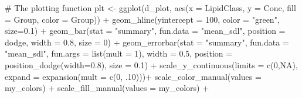 \documentclass[
  letterpaper,
  DIV=11,
  numbers=noendperiod]{scrreprt}
\newenvironment{Shaded}{\begin{snugshade}}{\end{snugshade}}
\newcommand{\AttributeTok}[1]{\textcolor[rgb]{0.40,0.45,0.13}{#1}}
\newcommand{\CommentTok}[1]{\textcolor[rgb]{0.37,0.37,0.37}{#1}}
\newcommand{\ConstantTok}[1]{\textcolor[rgb]{0.56,0.35,0.01}{#1}}
\newcommand{\DecValTok}[1]{\textcolor[rgb]{0.68,0.00,0.00}{#1}}
\newcommand{\FloatTok}[1]{\textcolor[rgb]{0.68,0.00,0.00}{#1}}
\newcommand{\FunctionTok}[1]{\textcolor[rgb]{0.28,0.35,0.67}{#1}}
\newcommand{\NormalTok}[1]{\textcolor[rgb]{0.00,0.23,0.31}{#1}}
\newcommand{\OtherTok}[1]{\textcolor[rgb]{0.00,0.23,0.31}{#1}}
\newcommand{\SpecialCharTok}[1]{\textcolor[rgb]{0.37,0.37,0.37}{#1}}
\newcommand{\StringTok}[1]{\textcolor[rgb]{0.13,0.47,0.30}{#1}}
\begin{document}
\begin{Shaded}
\begin{Highlighting}[]
\CommentTok{\# The plotting function}
\NormalTok{plt }\OtherTok{\textless{}{-}} \FunctionTok{ggplot}\NormalTok{(d\_plot, }\FunctionTok{aes}\NormalTok{(}\AttributeTok{x =}\NormalTok{ LipidClass, }\AttributeTok{y =}\NormalTok{ Conc, }\AttributeTok{fill =}\NormalTok{ Group, }\AttributeTok{color =}\NormalTok{ Group)) }\SpecialCharTok{+} 
  \FunctionTok{geom\_hline}\NormalTok{(}\AttributeTok{yintercept =} \DecValTok{100}\NormalTok{, }\AttributeTok{color =} \StringTok{"green"}\NormalTok{, }\AttributeTok{size=}\FloatTok{0.1}\NormalTok{) }\SpecialCharTok{+}
  \FunctionTok{geom\_bar}\NormalTok{(}\AttributeTok{stat =} \StringTok{"summary"}\NormalTok{, }\AttributeTok{fun.data =} \StringTok{"mean\_sdl"}\NormalTok{, }
           \AttributeTok{position =} \StringTok{\textquotesingle{}dodge\textquotesingle{}}\NormalTok{, }\AttributeTok{width =} \FloatTok{0.8}\NormalTok{, }\AttributeTok{size  =} \DecValTok{0}\NormalTok{) }\SpecialCharTok{+}
  \FunctionTok{geom\_errorbar}\NormalTok{(}\AttributeTok{stat =} \StringTok{"summary"}\NormalTok{, }\AttributeTok{fun.data =} \StringTok{"mean\_sdl"}\NormalTok{, }\AttributeTok{fun.args =} \FunctionTok{list}\NormalTok{(}\AttributeTok{mult =} \DecValTok{1}\NormalTok{), }
                \AttributeTok{width =} \FloatTok{0.5}\NormalTok{, }\AttributeTok{position =} \FunctionTok{position\_dodge}\NormalTok{(}\AttributeTok{width=}\FloatTok{0.8}\NormalTok{), }\AttributeTok{size =} \FloatTok{0.1}\NormalTok{) }\SpecialCharTok{+} 
  \FunctionTok{scale\_y\_continuous}\NormalTok{(}\AttributeTok{limits =} \FunctionTok{c}\NormalTok{(}\DecValTok{0}\NormalTok{,}\ConstantTok{NA}\NormalTok{), }\AttributeTok{expand =} \FunctionTok{expansion}\NormalTok{(}\AttributeTok{mult =} \FunctionTok{c}\NormalTok{(}\DecValTok{0}\NormalTok{, .}\DecValTok{10}\NormalTok{)))}\SpecialCharTok{+}
  \FunctionTok{scale\_color\_manual}\NormalTok{(}\AttributeTok{values =}\NormalTok{ my\_colors) }\SpecialCharTok{+}
  \FunctionTok{scale\_fill\_manual}\NormalTok{(}\AttributeTok{values =}\NormalTok{ my\_colors) }\SpecialCharTok{+}


\end{Highlighting}
\end{Shaded}
\end{document}
